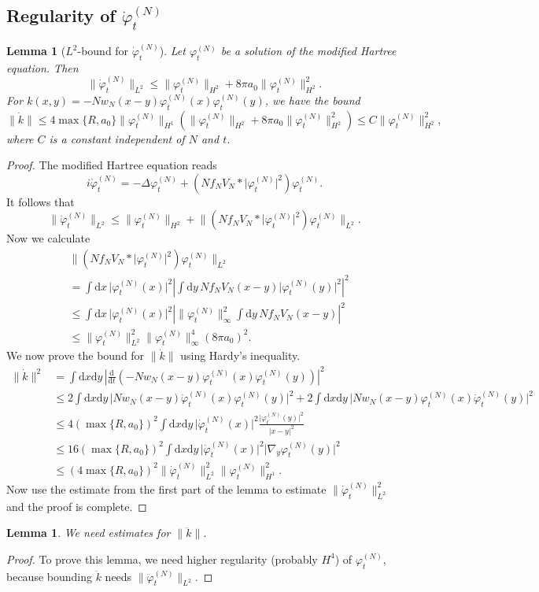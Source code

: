 \documentclass[11pt,a4paper]{scrartcl}
\let\oldmarginpar\marginpar
\renewcommand\marginpar[1]{\-\oldmarginpar[\raggedleft\footnotesize #1]%
  {\raggedright\footnotesize #1}}
\newtheorem{lem}[thm]{Lemma}
\newcommand{\di}{\textrm{d}}		%
\newcommand{\norm}[1]{\lVert#1\rVert}	%
\newcommand{\ph}{\varphi_t^{(N)}}	%
\newcommand{\phdot}{\dot{\varphi}_t^{(N)}}	%
\newcommand{\phddot}{\ddot{\varphi}_t^{(N)}}	%
\newcommand{\bd}{\begin{displaymath}}			%
\newcommand{\ed}{\end{displaymath}}
\begin{document}
\subsection{Regularity of $\phdot$}
\begin{lem}[$L^2$-bound for $\phdot$]
\label{lm:phdotregularity}
Let $\ph$ be a solution of the modified Hartree equation. Then
 \bd
\norm{\phdot}_{L^2} \leq \norm{\ph}_{H^2} + 8\pi a_0 \norm{\ph}_{H^2}^2.
\ed
For $k(x,y) = -N w_N(x-y) \ph(x) \ph(y)$, we have the bound
\bd
\norm{\dot k} \leq 4 \max\{R,a_0\} \norm{\ph}_{H^1} \left( \norm{\ph}_{H^2} + 8\pi a_0 \norm{\ph}_{H^2}^2\right) \leq C \norm{\ph}_{H^2}^2,
\ed
where $C$ is a constant independent of $N$ and $t$.
\end{lem}
\begin{proof} The modified Hartree equation reads
\bd
i \phdot = -\Delta \ph + \left(N f_N V_N \ast \lvert \ph \rvert^2 \right) \ph.
\ed
It follows that
\bd
\norm{\phdot}_{L^2} \leq \norm{\ph}_{H^2} + \norm{\left(N f_N V_N \ast \lvert \ph\rvert^2 \right)\ph}_{L^2}.
\ed
Now we calculate
\begin{align*}
& \norm{\left(N f_N V_N \ast \lvert \ph\rvert^2 \right)\ph}_{L^2} \\
& = \int \di x\, \lvert \ph(x)\rvert^2 \left\lvert \int \di y\, N f_NV_N(x-y) \lvert \ph(y)\rvert^2 \right\rvert^2 \\
& \leq \int \di x\, \lvert \ph(x)\rvert^2 \left\lvert \norm{\ph}_\infty^2 \int \di y\, N f_N V_N(x-y) \right\rvert^2 \\
& \leq \norm{\ph}_{L^2}^2 \norm{\ph}_\infty^4 (8\pi a_0)^2.
\end{align*}
We now prove the bound for $\norm{\dot k}$ using Hardy's inequality.
\begin{align*}
\norm{\dot k}^2 & = \int \di x\di y\, \left\lvert \frac{\di}{\di t} \left( -N w_N(x-y) \ph(x)\ph(y) \right) \right\rvert^2 \\
& \leq 2 \int \di x\di y\, \lvert N w_N(x-y) \phdot(x) \ph(y) \rvert^2 + 2 \int \di x \di y\, \lvert N w_N(x-y) \ph(x) \phdot(y) \rvert^2 \\
& \leq 4 \left( \max\{R,a_0\} \right)^2 \int \di x\di y\, \lvert \phdot(x)\rvert^2 \frac{\lvert\ph(y)\rvert^2}{\lvert x-y\rvert^2} \\
& \leq 16 \left( \max\{R,a_0\} \right)^2 \int \di x\di y\, \lvert \phdot(x)\rvert^2 \lvert \nabla_y \ph(y)\rvert^2 \\
& \leq \left( 4 \max\{R,a_0\} \right)^2 \norm{\phdot}_{L^2}^2 \norm{\ph}_{H^1}^2.
\end{align*}
Now use the estimate from the first part of the lemma to estimate $\norm{\phdot}_{L^2}^2$ and the proof is complete.
\end{proof}

\begin{lem}
We need estimates for $\norm{\ddot k}$.\marginpar{TODO}
\end{lem}
\begin{proof}
To prove this lemma, we need higher regularity (probably $H^4$) of $\ph$, because bounding $\ddot k$ needs $\norm{\phddot}_{L^2}$.  
\end{proof}



\end{document}

